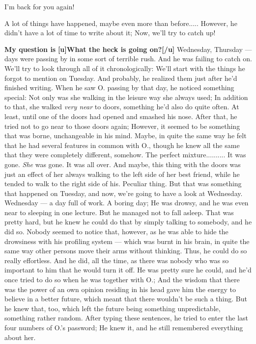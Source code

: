 I'm back for you again!

A lot of things have happened, maybe even more than before.....
However, he didn't have a lot of time to write about it; Now, we'll try to catch up!

\textbf{My question is}
\textbf{[u]What the heck is going on?[/u]}
Wednesday, Thursday --- days were passing by in some sort of terrible rush. 
And he was failing to catch on. 
We'll try to look through all of it chronologically: We'll start with the things he forgot to mention on Tuesday. 
And probably, he realized them just after he'd finished writing. 
When he saw O. passing by that day, he noticed something special: Not only was she walking in the leisure way she always used; In addition to that, she walked \emph{very near} to doors, something he'd also do quite often. 
At least, until one of the doors had opened and smashed his nose. 
After that, he tried not to go near to those doors again; However, it seemed to be something that was borne, unchangeable in his mind. 
Maybe, in quite the same way he felt that he had several features in common with O., though he knew all the same that they were completely different, somehow. 
The perfect mixture..........
It was gone. \emph{She} was gone. It was all over. 
And maybe, this thing with the doors was just an effect of her always walking to the left side of her best friend, while he tended to walk to the right side of his. 
Peculiar thing. 
But that was something that happened on Tuesday, and now, we're going to have a look at Wednesday. 
Wednesday --- a day full of work. A boring day; He was drowsy, and he was even near to sleeping in one lecture. But he managed not to fall asleep. 
That was pretty hard, but he knew he could do that by simply talking to somebody, and he did so. 
Nobody seemed to notice that, however, as he was able to hide the drowsiness with his profiling system --- which was burnt in his brain, in quite the same way other persons move their arms without thinking. Thus, he could do so really effortless. 
And he did, all the time, as there was nobody who was so important to him that he would turn it off. He was pretty sure he could, and he'd once tried to do so when he was together with O.; And the wisdom that there was the power of an own opinion residing in his head gave him the energy to believe in a better future, which meant that there wouldn't be such a thing. 
But he knew that, too, which left the future being something unpredictable, something rather random. 
After typing these sentences, he tried to enter the last four numbers of O.'s password; He knew it, and he still remembered everything about her. 
